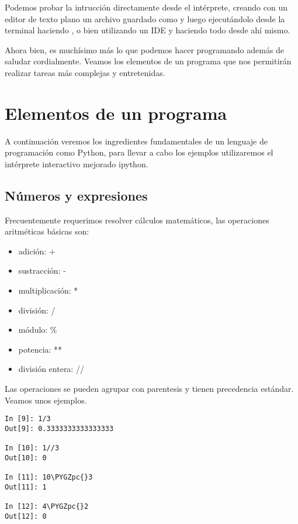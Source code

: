 \documentclass[a4paper,12pt,spanish]{sphinxmanual}
\def\PYGZpc{\char`\%}
\begin{document}
Podemos probar la intrucción directamente desde el intérprete, creando
con un editor de texto plano un archivo guardado como  y
luego ejecutándolo desde la terminal haciendo , o
bien utilizando un IDE y haciendo todo desde ahí mismo.

Ahora bien, es muchísimo más lo que podemos hacer programando además de
saludar cordialmente. Veamos los elementos de un programa que nos
permitirán realizar tareas más complejas y entretenidas.


\section{Elementos de un programa}
\label{Unidad01:elementos-de-un-programa}
A continuación veremos los ingredientes fundamentales de un lenguaje de
programación como Python, para llevar a cabo los ejemplos utilizaremos
el intérprete interactivo mejorado ipython.


\subsection{Números y expresiones}
\label{Unidad01:numeros-y-expresiones}
Frecuentemente requerimos resolver cálculos matemáticos, las operaciones
aritméticas básicas son:
\begin{itemize}
\item {} 
adición: +

\item {} 
sustracción: -

\item {} 
multiplicación: *

\item {} 
división: /

\item {} 
módulo: \%

\item {} 
potencia: **

\item {} 
división entera: //

\end{itemize}

Las operaciones se pueden agrupar con parentesis y tienen precedencia
estándar. Veamos unos ejemplos.

\begin{Verbatim}[commandchars=\\\{\}]
In [9]: 1/3
Out[9]: 0.3333333333333333

In [10]: 1//3
Out[10]: 0

In [11]: 10\PYGZpc{}3
Out[11]: 1

In [12]: 4\PYGZpc{}2
Out[12]: 0
\end{Verbatim}
\end{document}
